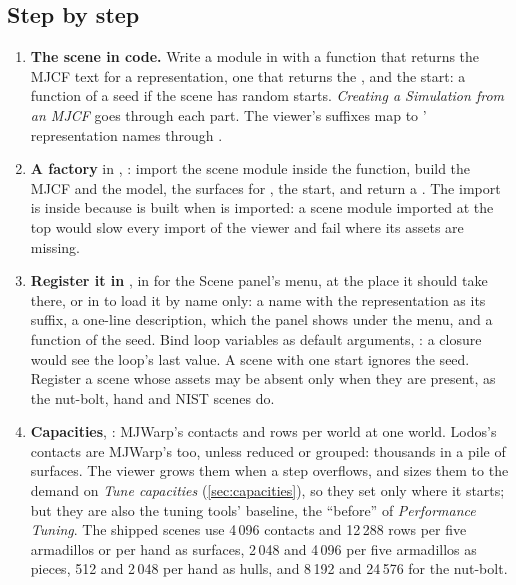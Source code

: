 \subsection{Step by step}\label{sec:steps}

\begin{enumerate}
\item \textbf{The scene in code.} Write a module in  with a function that returns the MJCF text for a representation, one that returns the , and the start: a function of a seed if the scene has random starts. \emph{Creating a Simulation from an MJCF} goes through each part. The viewer's suffixes map to ' representation names through .
\item \textbf{A factory} in , : import the scene module inside the function, build the MJCF and the model, the surfaces for , the start, and return a . The import is inside because  is built when  is imported: a scene module imported at the top would slow every import of the viewer and fail where its assets are missing.
\item \textbf{Register it in }, in  for the Scene panel's menu, at the place it should take there, or in  to load it by name only: a name with the representation as its suffix, a one-line description, which the panel shows under the menu, and a function of the seed. Bind loop variables as default arguments, : a closure would see the loop's last value. A scene with one start ignores the seed. Register a scene whose assets may be absent only when they are present, as the nut-bolt, hand and NIST scenes do.
\item \textbf{Capacities}, : MJWarp's contacts and rows per world at one world. Lodos's contacts are MJWarp's too, unless reduced or grouped: thousands in a pile of surfaces. The viewer grows them when a step overflows, and sizes them to the demand on \emph{Tune capacities} (\cref{sec:capacities}), so they set only where it starts; but they are also the tuning tools' baseline, the ``before'' of \emph{Performance Tuning}. The shipped scenes use 4\,096 contacts and 12\,288 rows per five armadillos or per hand as surfaces, 2\,048 and 4\,096 per five armadillos as pieces, 512 and 2\,048 per hand as hulls, and 8\,192 and 24\,576 for the nut-bolt.

\end{enumerate}
